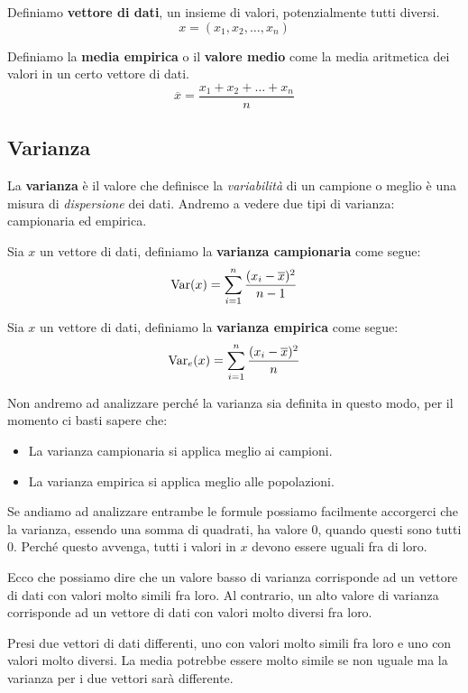 \begin{definition} \label{vettore}
	Definiamo \textbf{vettore di dati}, un insieme di valori, potenzialmente tutti diversi.
	\[ x = (x_1, x_2, \dots, x_n) \]
\end{definition}

\begin{definition}
	Definiamo la \textbf{media empirica} o il \textbf{valore medio} come la media aritmetica dei valori in un certo
	vettore di dati.
	\[ \overline{x} = \frac{x_1 + x_2 + \dots + x_n}{n} \]
\end{definition}

\subsection{Varianza}
La \textbf{varianza} è il valore che definisce la \emph{variabilità} di un campione o meglio è una misura di
\emph{dispersione} dei dati. Andremo a vedere due tipi di varianza: campionaria ed empirica.

\begin{definition}
	Sia $x$ un vettore di dati, definiamo la \textbf{varianza campionaria} come segue:
	\[ \operatorname{Var}(x) = \sum_{i=1}^n \frac{(x_i - \overline{x})^2}{n - 1} \]
\end{definition}

\begin{definition}
	Sia $x$ un vettore di dati, definiamo la \textbf{varianza empirica} come segue:
	\[ \operatorname{Var}_e(x) = \sum_{i=1}^n \frac{(x_i - \overline{x})^2}{n} \]
\end{definition}

Non andremo ad analizzare perché la varianza sia definita in questo modo, per il momento ci basti sapere che:
\begin{itemize}
	\item La varianza campionaria si applica meglio ai campioni.
	\item La varianza empirica si applica meglio alle popolazioni.
\end{itemize}

\begin{observation}
	Se andiamo ad analizzare entrambe le formule possiamo facilmente accorgerci che la varianza, essendo una somma di
	quadrati, ha valore 0, quando questi sono tutti 0. Perché questo avvenga, tutti i valori in $x$ devono essere
	uguali fra di loro.

	Ecco che possiamo dire che un valore basso di varianza corrisponde ad un vettore di dati con valori molto simili
	fra loro. Al contrario, un alto valore di varianza corrisponde ad un vettore di dati con valori molto diversi fra
	loro.

	Presi due vettori di dati differenti, uno con valori molto simili fra loro e uno con valori molto diversi. La
	media potrebbe essere molto simile se non uguale ma la varianza per i due vettori sarà differente.
\end{observation}

